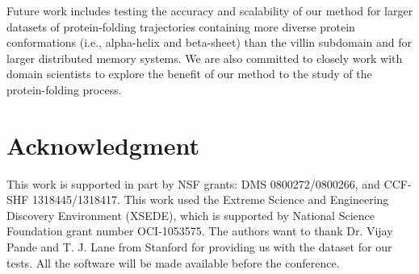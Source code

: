 \documentclass[10pt,conference,compsocconf]{IEEEtran}
\begin{document}
Future work includes testing the accuracy and scalability of our method for 
larger datasets of protein-folding trajectories containing more diverse
protein conformations (i.e., alpha-helix and beta-sheet) than the
villin subdomain and for larger distributed memory systems. We are also 
committed to closely work with domain scientists to
explore the benefit of our method to the study of the protein-folding
process.

\balance


\section*{Acknowledgment}
This work is supported in part by NSF grants: DMS 0800272/0800266, and CCF-SHF 1318445/1318417. This work used the Extreme Science and Engineering Discovery Environment (XSEDE), which is supported by National Science Foundation grant number OCI-1053575. The authors want to thank Dr. Vijay Pande and T. J. Lane from Stanford  for providing us with the dataset for our tests. All the software will be made available before the conference. 



%
%
%
%
%
\end{document}

